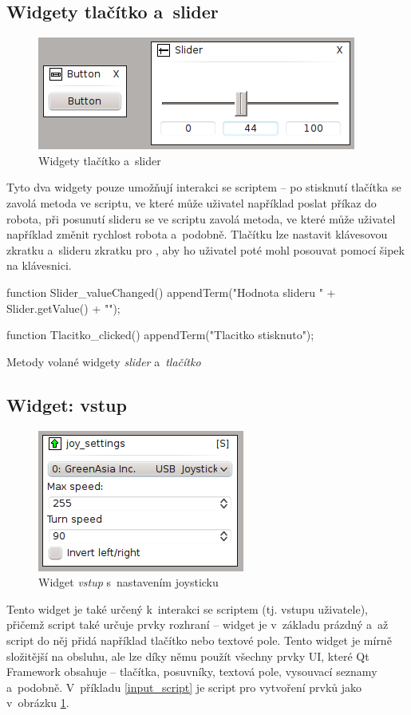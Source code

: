 \documentclass[12pt, a4paper, oneside]{article}
\newcommand{\It}{\textit}  %
\begin{document}
\subsection{Widgety tlačítko a~slider}
\begin{figure}[H]
\begin{center}
\includegraphics[scale=1]{img/w_btn_slider.png}
\caption{Widgety tlačítko a~slider}
\end{center}
\end{figure}
Tyto dva widgety pouze umožňují interakci se scriptem -- po stisknutí tlačítka se zavolá metoda ve scriptu, ve které může uživatel například poslat příkaz do robota, při posunutí slideru se ve scriptu zavolá metoda, ve které může uživatel například změnit rychlost robota a~podobně. Tlačítku lze nastavit klávesovou zkratku a~slideru zkratku pro , aby ho uživatel poté mohl posouvat pomocí šipek na klávesnici.
\begin{listing}[H]
\begin{jscode}
function Slider_valueChanged() {
    appendTerm("Hodnota slideru " + Slider.getValue() + "\n");
}

function Tlacitko_clicked() {
    appendTerm("Tlacitko stisknuto\n");
}
\end{jscode}
\caption{Metody volané widgety \It{slider} a~\It{tlačítko}}
\end{listing}

\subsection{Widget: vstup}
\begin{figure}[H]
\begin{center}
\includegraphics[scale=1]{img/w_input.png}
\caption{Widget \It{vstup} s~nastavením joysticku}
\label{input}
\end{center}
\end{figure}
Tento widget je také určený k~interakci se scriptem (tj. vstupu uživatele), přičemž script také určuje prvky rozhraní -- widget je v~základu prázdný a~až script do něj přidá například tlačítko nebo textové pole. Tento widget je mírně složitější na obsluhu, ale lze díky němu použít všechny prvky UI, které Qt Framework obsahuje -- tlačítka, posuvníky, textová pole, vysouvací seznamy a~podobně. V~příkladu \ref{input_script} je script pro vytvoření prvků jako v~obrázku \ref{input}.
\end{document}
